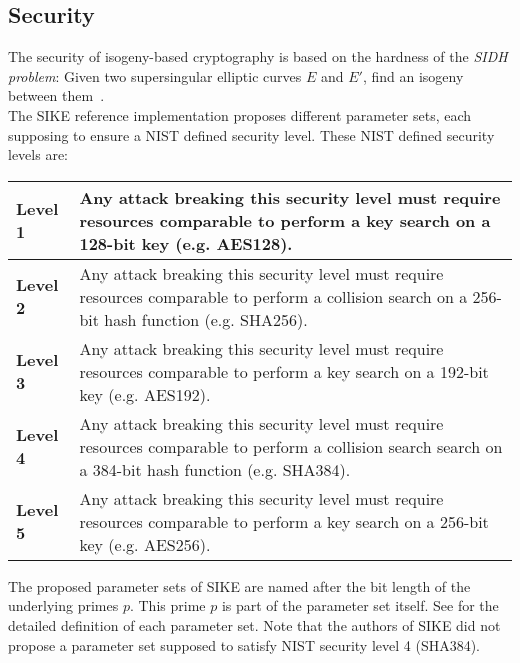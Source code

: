 \subsection{Security}\label{sidh_security}
The security of isogeny-based cryptography is based on the hardness of the \textit{\gls{SIDH} problem}: Given two supersingular elliptic curves $E$ and $E'$, find an isogeny between them~\parencite{sike2020spec}. 
\\
The \gls{SIKE} reference implementation proposes different parameter sets, each supposing to ensure a \gls{NIST} defined security level. These \gls{NIST} defined security levels are:\\
\renewcommand\arraystretch{2}
\begin{tabular}{ | L{2cm} | L{13cm} | }  
\hline
    \textbf{Level 1}
    &
    Any attack breaking this security level must require resources comparable to perform a key search on a 128-bit key (e.g. AES128). \\
\hline
    \textbf{Level 2}
    &
    Any attack breaking this security level must require resources comparable to perform a collision search on a 256-bit hash function (e.g. SHA256). \\
\hline
    \textbf{Level 3}
    &
    Any attack breaking this security level must require resources comparable to perform a key search on a 192-bit key (e.g. AES192). \\
\hline
    \textbf{Level 4}
    &
    Any attack breaking this security level must require resources comparable to perform a collision search search on a 384-bit hash function (e.g. SHA384). \\
\hline
    \textbf{Level 5}
    &
    Any attack breaking this security level must require resources comparable to perform a key search on a 256-bit key (e.g. AES256). \\
\hline
\end{tabular}
\renewcommand\arraystretch{1}
\newline
The proposed parameter sets of \gls{SIKE} are named after the bit length of the underlying primes $p$. This prime $p$ is part of the parameter set itself. See \parencite{sike2020spec} for the detailed definition of each parameter set. Note that the authors of SIKE did not propose a parameter set supposed to satisfy \gls{NIST} security level 4 (SHA384).

